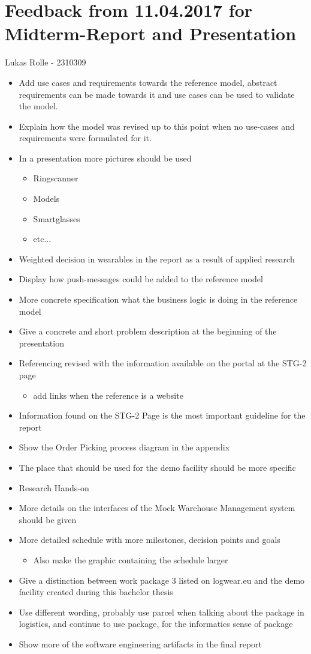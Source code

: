 \documentclass[a4paper,11pt]{report}
\begin{document}
\section*{Feedback from 11.04.2017 for Midterm-Report and Presentation}
Lukas Rolle - 2310309

\begin{itemize}
	\item Add use cases and requirements towards the reference model, abstract requirements can be made towards it and use cases can be used to validate the model.
	\item Explain how the model was revised up to this point when no use-cases and requirements were formulated for it.
	\item In a presentation more pictures should be used
	\begin{itemize}
		\item Ringscanner
		\item Models
		\item Smartglasses
		\item etc...
	\end{itemize}
	\item Weighted decision in wearables in the report as a result of applied research
	\item Display how push-messages could be added to the reference model
	\item More concrete specification what the business logic is doing in the reference model
	\item Give a concrete and short problem description at the beginning of the presentation
	\item Referencing revised with the information available on the portal at the STG-2 page
	\begin{itemize}
		\item add links when the reference is a website
	\end{itemize}
	\item Information found on the STG-2 Page is the most important guideline for the report
	\item Show the Order Picking process diagram in the appendix
	\item The place that should be used for the demo facility should be more specific
	\item Research Hands-on
	\item More details on the interfaces of the Mock Warehouse Management system should be given
	\item More detailed schedule with more milestones, decision points and goals
	\begin{itemize}
		\item Also make the graphic containing the schedule larger
	\end{itemize}
	\item Give a distinction between work package 3 listed on logwear.eu and the demo facility created during this bachelor thesis
	\item Use different wording, probably use parcel when talking about the package in logistics, and continue to use package, for the informatics sense of package
	\item Show more of the software engineering artifacts in the final report
\end{itemize}
\end{document}
